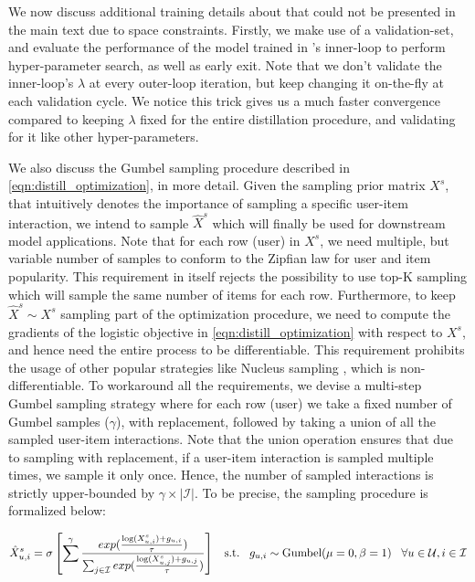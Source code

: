 \documentclass{article}
\begin{document}
We now discuss additional training details about \sampler that could not be presented in the main text due to space constraints. Firstly, we make use of a validation-set, and evaluate the performance of the \model model trained in \sampler's inner-loop to perform hyper-parameter search, as well as early exit. Note that we don't validate the inner-loop's $\lambda$ at every outer-loop iteration, but keep changing it on-the-fly at each validation cycle. We notice this trick gives us a much faster convergence compared to keeping $\lambda$ fixed for the entire distillation procedure, and validating for it like other hyper-parameters.

We also discuss the Gumbel sampling procedure described in \cref{eqn:distill_optimization}, in more detail. Given the sampling prior matrix $X^s$, that intuitively denotes the importance of sampling a specific user-item interaction, we intend to sample $\hat{X}^s$ which will finally be used for downstream model applications. Note that for each row (user) in $X^s$, we need multiple, but variable number of samples to conform to the Zipfian law for user and item popularity. This requirement in itself rejects the possibility to use top-K sampling which will sample the same number of items for each row. Furthermore, to keep $\hat{X}^s \sim X^s$ sampling part of the optimization procedure, we need to compute the gradients of the logistic objective in \cref{eqn:distill_optimization} with respect to $X^s$, and hence need the entire process to be differentiable. This requirement prohibits the usage of other popular strategies like Nucleus sampling \cite{nucleus}, which is non-differentiable. To workaround all the requirements, we devise a multi-step Gumbel sampling strategy where for each row (user) we take a fixed number of Gumbel samples ($\gamma$), with replacement, followed by taking a union of all the sampled user-item interactions. Note that the union operation ensures that due to sampling with replacement, if a user-item interaction is sampled multiple times, we sample it only once. Hence, the number of sampled interactions is strictly upper-bounded by $\gamma \times |\mathcal{I}|$. To be precise, the sampling procedure is formalized below:

\begin{align*} \begin{gathered}
    \hat{X}^s_{u, i} = \sigma \left[ \sum^{\gamma} \frac{exp(\frac{\log(X^s_{u, i}) + g_{u, i}}{\tau})}{\sum_{j \in \mathcal{I}} exp(\frac{\log(X^s_{u, j}) + g_{u, j}}{\tau})} \right] \hspace{0.3cm} \text{s.t.} \hspace{0.3cm} g_{u, i} \sim \text{Gumbel}(\mu = 0, \beta = 1) \hspace{0.3cm} \forall u \in \mathcal{U}, i \in \mathcal{I}
\end{gathered}
\end{align*}
\end{document}
